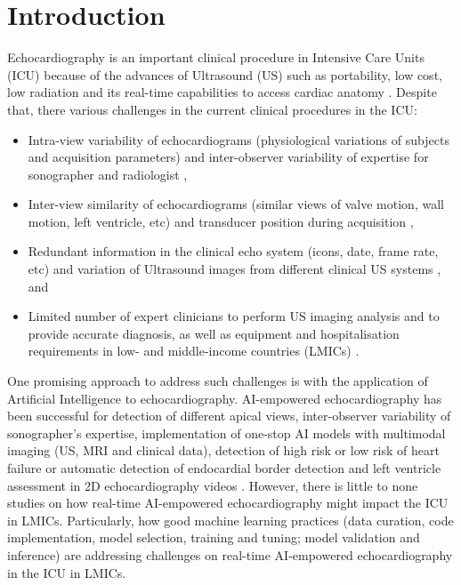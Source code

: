 \documentclass[mlabstract,twocolumn]{jmlr}
\begin{document}
\section{Introduction}
\label{sec:intro}
Echocardiography is an important clinical procedure in Intensive Care Units (ICU) because of the advances of Ultrasound (US) such as portability, low cost, low radiation and its real-time capabilities to access cardiac anatomy \citep{Feigenbaum1996, Vieillard-Baron2008, singh2007, cambell2018}.
Despite that, there various challenges in the current clinical procedures in the ICU:
\begin{itemize}
\setlength\itemsep{0em}
\item Intra-view variability of echocardiograms (physiological variations of subjects and acquisition parameters) and inter-observer variability of expertise for sonographer and radiologist \citep{khamis2017, Feigenbaum1996, field2011},
\item Inter-view similarity of echocardiograms (similar views of valve motion, wall motion, left ventricle, etc) and transducer position during acquisition \citep{zhang2018},
\item Redundant information in the clinical echo system (icons, date, frame rate, etc) \citep{khamis2017} and variation of Ultrasound images from different clinical US systems \citep{brindise2020unsupervised}, and
\item Limited number of expert clinicians to perform US imaging analysis and to provide accurate diagnosis, as well as equipment and hospitalisation requirements in low- and middle-income countries (LMICs) \citep{hao2021-wellcome, 2021-huyNhat-vanHao-in-FAIR-MICCAI}.
\end{itemize}
One promising approach to address such challenges is with the application of Artificial Intelligence to echocardiography.
AI-empowered echocardiography has been successful for detection of different apical views, inter-observer variability of sonographer's expertise, implementation of one-stop AI models with multimodal imaging (US, MRI and clinical data), detection of high risk or low risk of heart failure or automatic detection of endocardial border detection and left ventricle assessment in 2D echocardiography videos \citep{tromp2022, zhang2022-mdpi, behnami2020, ono2022}.
However, there is little to none studies on how real-time AI-empowered echocardiography might impact the ICU in LMICs.
Particularly, how good machine learning practices (data curation, code implementation, model selection, training and tuning; model validation and inference) are addressing challenges on real-time AI-empowered echocardiography in the ICU in LMICs.
\end{document}
